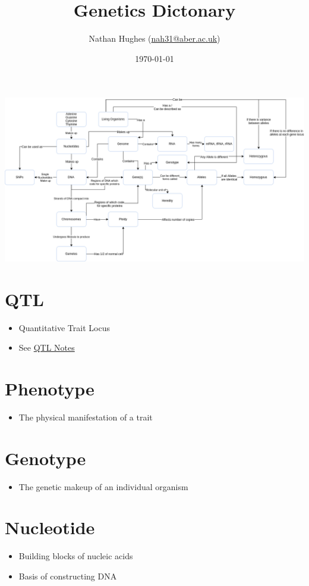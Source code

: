 \documentclass[a4paper]{article}
\author{Nathan Hughes (\href{mailto:nah31@aber.ac.uk}{nah31@aber.ac.uk})}
\date{\today}
\title{Genetics Dictonary}
\begin{document}
\maketitle
\maketitle
\includegraphics[width=.9\linewidth]{./images/biologyTree.png}
\clearpage
\tableofcontents
\clearpage


\section{QTL}
\label{sec-1}
\begin{itemize}
\item Quantitative Trait Locus
\item See \href{./QTL.pdf}{QTL Notes}
\end{itemize}

\section{Phenotype}
\label{sec-2}
\begin{itemize}
\item The physical manifestation of a trait
\end{itemize}

\section{Genotype}
\label{sec-3}
\begin{itemize}
\item The genetic makeup of an individual organism
\end{itemize}

\section{Nucleotide}
\label{sec-4}
\begin{itemize}
\item Building blocks of nucleic acids
\item Basis of constructing DNA
\end{itemize}
\end{document}
